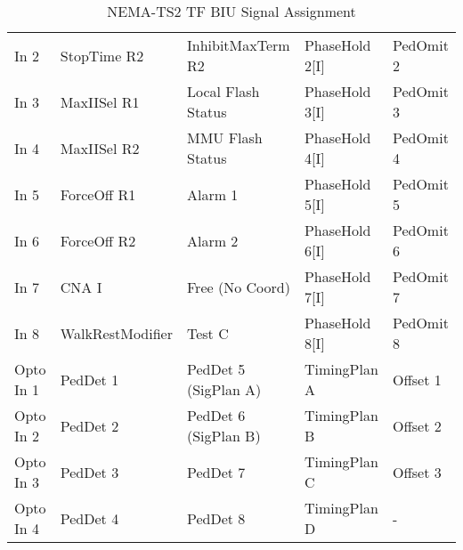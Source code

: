 \documentclass[]{article}
\begin{document}
\begin{table}[]
{\begin{tabular}{lllll}
			In 2                              & StopTime R2                                  & InhibitMaxTerm R2                               & PhaseHold 2{[}I{]}       & PedOmit 2                                \\
			In 3                              & MaxIISel R1                                  & Local Flash Status                              & PhaseHold 3{[}I{]}       & PedOmit 3                                \\
			In 4                              & MaxIISel R2                                  & MMU Flash Status                                & PhaseHold 4{[}I{]}       & PedOmit 4                                \\
			In 5                              & ForceOff R1                                  & Alarm 1                                         & PhaseHold 5{[}I{]}       & PedOmit 5                                \\
			In 6                              & ForceOff R2                                  & Alarm 2                                         & PhaseHold 6{[}I{]}       & PedOmit 6                                \\
			In 7                              & CNA I                                        & Free (No Coord)                                 & PhaseHold 7{[}I{]}       & PedOmit 7                                \\
			In 8                              & WalkRestModifier                             & Test C                                          & PhaseHold 8{[}I{]}       & PedOmit 8                                \\
			Opto In 1                         & PedDet 1                                     & PedDet 5 (SigPlan A)                            & TimingPlan A             & Offset 1                                 \\
			Opto In 2                         & PedDet 2                                     & PedDet 6 (SigPlan B)                            & TimingPlan B             & Offset 2                                 \\
			Opto In 3                         & PedDet 3                                     & PedDet 7                                        & TimingPlan C             & Offset 3                                 \\
			Opto In 4                         & PedDet 4                                     & PedDet 8                                        & TimingPlan D             & -                                        \\ \hline
		\end{tabular}%
	}
	\caption{NEMA-TS2 TF BIU Signal Assignment}
	\label{tab:tf-biu-signal-assignment}
\end{table}
\end{document}

